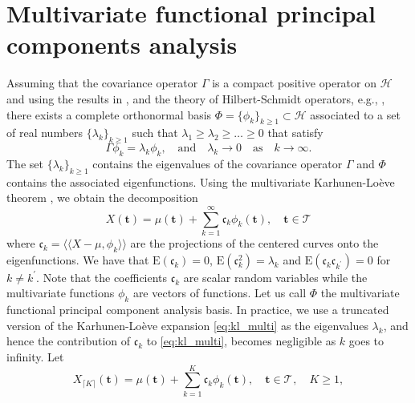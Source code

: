\documentclass[times,sort&compress,3p]{elsarticle}
\theoremstyle{plain}%
\theoremstyle{definition}
\newcommand{\EE}{\mathrm{E}} %
\newcommand{\TT}[1]{\mathcal{T}_{#1}} %
\newcommand{\HH}{\mathcal{H}} %
\newcommand{\pointt}{\mathbf{t}} %
\newcommand{\inH}[2]{\langle\!\langle#1, #2\rangle\!\rangle}
\begin{document}


\section{Multivariate functional principal components analysis} %
\label{sec:functional_principal_components_analysis}

Assuming that the covariance operator $\Gamma$ is a compact positive operator on $\HH$ and using the results in \cite{happMultivariateFunctionalPrincipal2018a}, and the theory of Hilbert-Schmidt operators, e.g., \cite{reedMethodsModernMathematical1980}, there exists a complete orthonormal basis 
$\Phi = \{\phi_k\}_{k \geq 1} \subset \HH$ associated to a set of real numbers $\{\lambda_k\}_{k \geq 1}$ such that $\lambda_1 \geq \lambda_2 \geq \dots \geq 0$ that satisfy
\begin{equation}\label{eq:eigendecomposition}
    \Gamma \phi_k = \lambda_k \phi_k, \quad\text{and}\quad \lambda_k \longrightarrow 0 \quad\text{as}\quad k \longrightarrow \infty.
\end{equation}
The set $\{\lambda_k\}_{k \geq 1}$ contains the eigenvalues of the covariance operator $\Gamma$ and $\Phi$ contains the associated eigenfunctions. Using the multivariate Karhunen-Loève theorem \citep{happMultivariateFunctionalPrincipal2018a}, we obtain the decomposition
\begin{equation}\label{eq:kl_multi}
    X(\pointt) = \mu(\pointt) + \sum_{k = 1}^\infty \mathfrak{c}_k \phi_k(\pointt), \quad \pointt \in \TT{}
\end{equation}
where $\mathfrak{c}_{k} = \inH{X - \mu}{\phi_k}$ are the projections of the centered curves onto the eigenfunctions. We have that $\EE(\mathfrak{c}_{k}) = 0$, $\EE(\mathfrak{c}_{k}^2) = \lambda_k$ and $\EE(\mathfrak{c}_{k}\mathfrak{c}_{k^\prime}) = 0$ for $k \neq k^\prime$. Note that the coefficients $\mathfrak{c}_k$ are scalar random variables while the multivariate functions $\phi_k$ are vectors of functions. Let us call $\Phi$ the multivariate functional principal component analysis basis. In practice, we use a truncated version of the Karhunen-Loève expansion \eqref{eq:kl_multi} as the eigenvalues $\lambda_k$, and hence the contribution of $\mathfrak{c}_k$ to \eqref{eq:kl_multi}, becomes negligible as $k$ goes to infinity. Let
\begin{equation}\label{eq:kl_multi_trunc}
    X_{\lceil K \rceil}(\pointt) = \mu(\pointt) + \sum_{k = 1}^K \mathfrak{c}_k \phi_k(\pointt), \quad \pointt \in \TT{}, \quad K \geq 1,
\end{equation}
\end{document}

